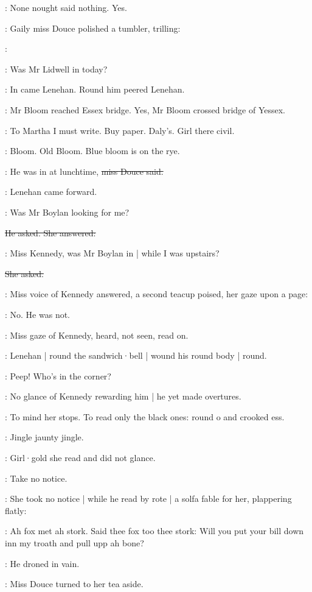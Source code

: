 :
None nought said nothing.
Yes.

:
Gaily miss Douce polished a tumbler,
trilling:

\MissD:

\lenehan:
Was Mr Lidwell in today?

:
In came Lenehan.
Round him peered Lenehan.

:
Mr Bloom reached Essex bridge.
Yes,
Mr Bloom crossed bridge of Yessex.

\BloomInt:
To Martha I must write.
Buy paper.
Daly's.
Girl there civil.

:
Bloom.
Old Bloom.
Blue bloom is on the rye.

\MissD:
He was in at lunchtime,
\sout{miss Douce said.}

:
Lenehan came forward.

\lenehan:
Was Mr Boylan looking for me?

\sout{He asked.
She answered:}

\MissD:
Miss Kennedy,
was Mr Boylan in |
while I was upstairs?

\sout{She asked.}

:
Miss voice of Kennedy answered,
a second teacup poised,
her gaze upon a page:

\MissK:
No.
He was not.

:
Miss gaze of Kennedy,
heard,
not seen,
read on.

:
Lenehan |
round the sandwich·bell |
wound his round body |
round.

\lenehan:
Peep!
Who's in the corner?

:
No glance of Kennedy rewarding him |
he yet made overtures.

:
To mind her stops.
To read only the black ones:
round o and crooked ess.

:
Jingle jaunty jingle.

:
Girl·gold she read and did not glance.

\MissKInt:
Take no notice.

:
She took no notice |
while he read by rote |
a solfa fable for her,
plappering flatly:

\lenehan:
Ah fox met ah stork.
Said thee fox too thee stork:
Will you put your bill down inn my troath
and pull upp ah bone?

:
He droned in vain.

:
Miss Douce turned to her tea aside.

